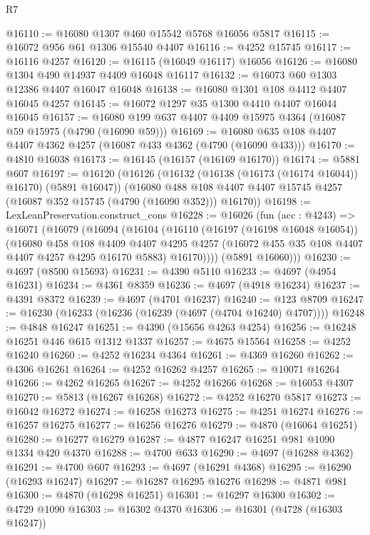 \begin{lexlean}{R7}
\begin{coremodule}
@16110 := @16080 @1307 @460 @15542 @5768 @16056 @5817
@16115 := @16072 @956 @61 @1306 @15540 @4407
@16116 := @4252 @15745
@16117 := @16116 @4257
@16120 := @16115 (@16049 @16117) @16056
@16126 := @16080 @1304 @490 @14937 @4409 @16048 @16117
@16132 := @16073 @60 @1303 @12386 @4407 @16047 @16048
@16138 := @16080 @1301 @108 @4412 @4407 @16045 @4257
@16145 := @16072 @1297 @35 @1300 @4410 @4407 @16044 @16045
@16157 := @16080 @199 @637 @4407 @4409 @15975 @4364 (@16087 @59 @15975 (@4790 (@16090 @59)))
@16169 := @16080 @635 @108 @4407 @4407 @4362 @4257 (@16087 @433 @4362 (@4790 (@16090 @433)))
@16170 := @4810 @16038
@16173 := @16145 (@16157 (@16169 @16170))
@16174 := @5881 @607
@16197 := @16120
    (@16126
      (@16132 (@16138 (@16173 (@16174 @16044)) @16170) (@5891 @16047))
      (@16080 @488 @108 @4407 @4407 @15745 @4257 (@16087 @352 @15745 (@4790 (@16090 @352))) @16170))
@16198 := LexLeanPreservation.construct_cons
@16228 := @16026
    (fun (acc : @4243) =>
    @16071
      (@16079
        (@16094
          (@16104
            (@16110
              (@16197 (@16198 @16048 @16054))
              (@16080
                @458
                @108
                @4409
                @4407
                @4295
                @4257
                (@16072 @455 @35 @108 @4407 @4407 @4257 @4295 @16170 @5883)
                @16170))))
        (@5891 @16060)))
@16230 := @4697 (@8500 @15693)
@16231 := @4390 @5110
@16233 := @4697 (@4954 @16231)
@16234 := @4361 @8359
@16236 := @4697 (@4918 @16234)
@16237 := @4391 @8372
@16239 := @4697 (@4701 @16237)
@16240 := @123 @8709
@16247 := @16230 (@16233 (@16236 (@16239 (@4697 (@4704 @16240) @4707))))
@16248 := @4848 @16247
@16251 := @4390 (@15656 @4263 @4254)
@16256 := @16248 @16251 @446 @615 @1312 @1337
@16257 := @4675 @15564
@16258 := @4252 @16240
@16260 := @4252 @16234 @4364
@16261 := @4369 @16260
@16262 := @4306 @16261
@16264 := @4252 @16262 @4257
@16265 := @10071 @16264
@16266 := @4262 @16265
@16267 := @4252 @16266
@16268 := @16053 @4307
@16270 := @5813 (@16267 @16268)
@16272 := @4252 @16270 @5817
@16273 := @16042 @16272
@16274 := @16258 @16273
@16275 := @4251 @16274
@16276 := @16257 @16275
@16277 := @16256 @16276
@16279 := @4870 (@16064 @16251)
@16280 := @16277 @16279
@16287 := @4877 @16247 @16251 @981 @1090 @1334 @420 @4370
@16288 := @4700 @633
@16290 := @4697 (@16288 @4362)
@16291 := @4700 @607
@16293 := @4697 (@16291 @4368)
@16295 := @16290 (@16293 @16247)
@16297 := @16287 @16295 @16276
@16298 := @4871 @981
@16300 := @4870 (@16298 @16251)
@16301 := @16297 @16300
@16302 := @4729 @1090
@16303 := @16302 @4370
@16306 := @16301 (@4728 (@16303 @16247))

\end{coremodule}
\end{lexlean}
